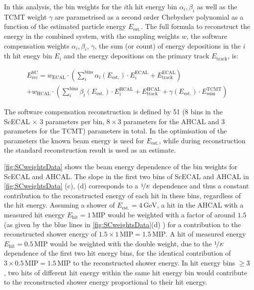 \documentclass[twoside,a4paper,12pt]{article}
\begin{document}
In this analysis, the bin weights for the $i$th hit energy bin $\alpha_i, \beta_i$ as well as the TCMT weight $\gamma$ are parametrised as a second order Chebyshev polynomial as a function of the estimated particle energy $E_\text{est.}$.
The full formula to reconstruct the energy in the combined system, with the sampling weights $w$, the software compensation weights $\alpha_i, \beta_i$, $\gamma$, the sum (or count) of energy depositions in the $i$th hit enegy bin $E_i$ and the energy depositions on the primary track $E_\text{track}$, is:

\begin{multline}
  E_\text{rec}^\text{SC}=w_{\text{ECAL}}\cdot\left( \sum_{i}^{\text{bins}}\alpha_i\left(E_\text{est.}\right)\cdot E^\text{ECAL}_i+E^\text{ECAL}_\text{track}\right) \\ + w_{\text{HCAL}} \cdot\left( \sum_{i}^{\text{bins}}\beta_i\left(E_\text{est.}\right)\cdot E^\text{HCAL}_i+E^\text{HCAL}_\text{track} + \gamma\left(E_\text{est.}\right)\cdot E^\text{TCMT}_\text{sum}\right)
\end{multline}

The software compensation reconstruction is defined by 51 (8 bins in the ScECAL $\times$ 3 parameters per bin, $8\times3$ parameters for the AHCAL and $3$ parameters for the TCMT) parameters in total. In the optimisation of the parameters the known beam energy is used for $E_\text{est.}$, while during reconstruction the standard reconstruction result is used as an estimate.

\autoref{fig:SCweightsData} shows the beam energy dependence of the bin weights for ScECAL and AHCAL. The slope in the first two bins of ScECAL and AHCAL in \autoref{fig:SCweightsData} (c), (d) corresponds to a $\nicefrac{1}{E}$ dependence and thus a constant contribution to the reconstructed energy of each hit in these bins, regardless of the hit energy. Assuming a shower of $E_\text{est.} = 4\,\text{GeV}$, a hit in the AHCAL with a measured hit energy $E_\text{hit} = 1\,\text{MIP}$ would be weighted with a factor of around $1.5$ (as given by the blue lines in \autoref{fig:SCweightsData}(d) ) for a contribution to the reconstructed shower energy of $1.5 \times 1\,\text{MIP} = 1.5\,\text{MIP}$. A hit of measured energy $E_\text{hit} = 0.5\,\text{MIP}$ would be weighted with the double weight, due to the $\nicefrac{1}{E}$ dependence of the first two hit energy bins, for the identical contribution of $3 \times 0.5\,\text{MIP} = 1.5\,\text{MIP}$ to the reconstructed shower energy. In hit energy bins $\geq 3$, two hits of different hit energy within the same hit energy bin would contribute to the reconstructed shower energy proportional to their hit energy.
\end{document}
